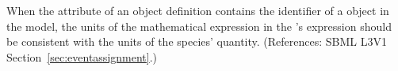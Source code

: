 When the  attribute of an \EventAssignment object
definition contains the identifier of a \Species object in the model, the
units of the mathematical expression in the \EventAssignment's 
expression should be consistent with the units of the species' quantity.
(References: SBML L3V1 Section~\ref{sec:eventassignment}.)
